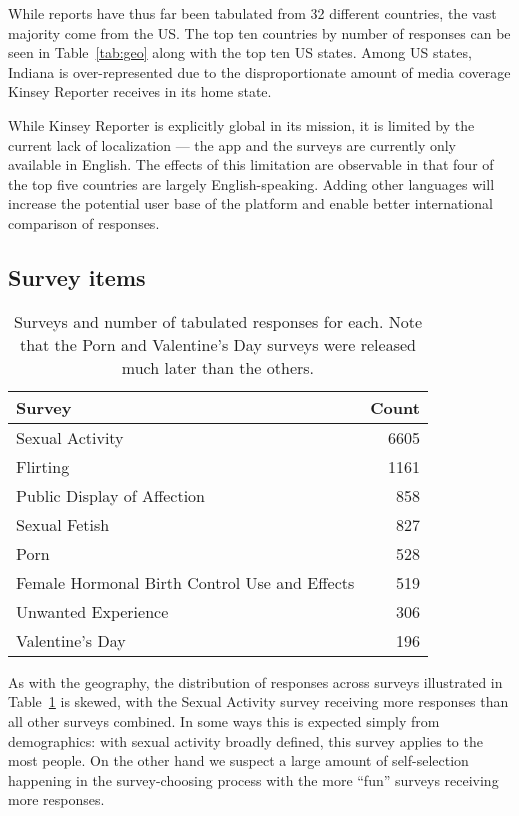 \documentclass{sigchi}
\begin{document}
While reports have thus far been tabulated from 32 different countries, the vast majority come from the US. The top ten countries by number of responses can be seen in Table~\ref{tab:geo} along with the top ten US states. Among US states, Indiana is over-represented due to the disproportionate amount of media coverage Kinsey Reporter receives in its home state.

While Kinsey Reporter is explicitly global in its mission, it is limited by the current lack of localization --- the app and the surveys are currently only available in English. The effects of this limitation are observable in that four of the top five countries are largely English-speaking. Adding other languages will increase the potential user base of the platform and enable better international comparison of responses.

\subsection{Survey items}

\begin{table}
\caption{Surveys and number of tabulated responses for each. Note that the Porn and Valentine's Day surveys were released much later than the others.}
\begin{tabular}{lr}
\hline
\textbf{Survey} & \textbf{Count} \\
\hline
Sexual Activity                               & 6605 \\
Flirting                                      & 1161 \\
Public Display of Affection                   &  858 \\
Sexual Fetish                                 &  827 \\
Porn                                          &  528 \\
Female Hormonal Birth Control Use and Effects &  519 \\
Unwanted Experience                           &  306 \\
Valentine's Day                               &  196 \\
\hline
\end{tabular}
\label{tab:surveys}
\end{table}

As with the geography, the distribution of responses across surveys illustrated in Table~\ref{tab:surveys} is skewed, with the Sexual Activity survey receiving more responses than all other surveys combined. In some ways this is expected simply from demographics: with sexual activity broadly defined, this survey applies to the most people. On the other hand we suspect a large amount of self-selection happening in the survey-choosing process with the more ``fun'' surveys receiving more responses.
\end{document}

